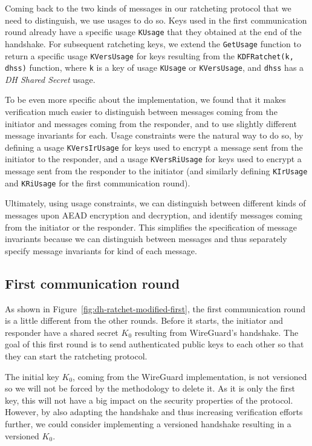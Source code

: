 Coming back to the two kinds of messages in our ratcheting protocol that we need to distinguish, we use usages to do so.
Keys used in the first communication round already have a specific usage \texttt{KUsage} that they obtained at the end of the handshake.
For subsequent ratcheting keys, we extend the \texttt{GetUsage} function to return a specific usage \texttt{KVersUsage} for keys resulting from the \texttt{KDFRatchet(k, dhss)} function, where \texttt{k} is a key of usage \texttt{KUsage} or \texttt{KVersUsage}, and \texttt{dhss} has a \emph{DH Shared Secret} usage.

To be even more specific about the implementation, we found that it makes verification much easier to distinguish between messages coming from the initiator and messages coming from the responder, and to use slightly different message invariants for each.
Usage constraints were the natural way to do so, by defining a usage \texttt{KVersIrUsage} for keys used to encrypt a message sent from the initiator to the responder, and a usage \texttt{KVersRiUsage} for keys used to encrypt a message sent from the responder to the initiator (and similarly defining \texttt{KIrUsage} and \texttt{KRiUsage} for the first communication round).

Ultimately, using usage constraints, we can distinguish between different kinds of messages upon AEAD encryption and decryption, and identify messages coming from the initiator or the responder.
This simplifies the specification of message invariants because we can distinguish between messages and thus separately specify message invariants for kind of each message.

\subsection{First communication round}
\label{sec:first-communication-round}

As shown in Figure~\ref{fig:dh-ratchet-modified-first}, the first communication round is a little different from the other rounds.
Before it starts, the initiator and responder have a shared secret $K_0$ resulting from WireGuard's handshake.
The goal of this first round is to send authenticated public keys to each other so that they can start the ratcheting protocol.

The initial key $K_0$, coming from the WireGuard implementation, is not versioned so we will not be forced by the methodology to delete it. As it is only the first key, this will not have a big impact on the security properties of the protocol.
However, by also adapting the handshake and thus increasing verification efforts further, we could consider implementing a versioned handshake resulting in a versioned $K_0$.

